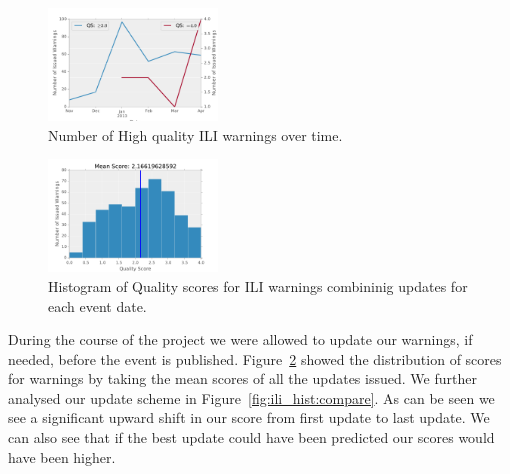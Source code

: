 \begin{figure}
  \includegraphics[width=0.4\textwidth]{../figures/ili/HighQualityWarnings.pdf}
  \caption{\label{fig:ili_temporal}Number of High quality ILI warnings over time.}
\end{figure}

\begin{figure}
  \includegraphics[width=0.4\textwidth]{../figures/ili/CombinedAllScore.pdf}
  \caption{\label{fig:ili_hist_all}Histogram of Quality scores for ILI warnings 
  combininig updates for each event date.}
\end{figure}



During the course of the project we were allowed to update our warnings, if 
needed, before the event is published. Figure~\ref{fig:ili_hist_all} showed 
the distribution of scores for warnings by taking the mean scores 
of all the updates issued.
We further analysed our update scheme in Figure~\ref{fig:ili_hist:compare}.
As can be seen we see a significant upward shift in our score from first 
update to last update. We can also see that if the best update could have
been predicted our scores would have been higher.

